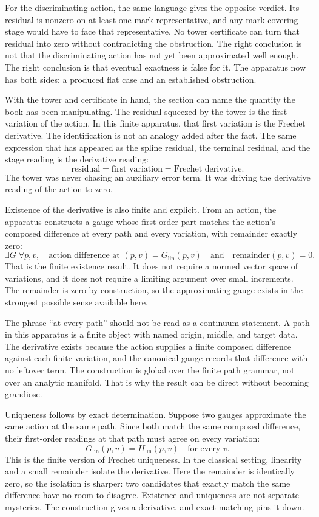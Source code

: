 For the discriminating action, the same language gives the opposite verdict.
Its residual is nonzero on at least one mark representative, and any
mark-covering stage would have to face that representative. No tower certificate
can turn that residual into zero without contradicting the obstruction. The
right conclusion is not that the discriminating action has not yet been
approximated well enough. The right conclusion is that eventual exactness is
false for it. The apparatus now has both sides: a produced flat case and an
established obstruction.

With the tower and certificate in hand, the section can name the quantity the
book has been manipulating. The residual squeezed by the tower is the first
variation of the action. In this finite apparatus, that first variation is the
Frechet derivative. The identification is not an analogy added after the fact.
The same expression that has appeared as the spline residual, the terminal
residual, and the stage reading is the derivative reading:
\[
  \text{residual}
  =
  \text{first variation}
  =
  \text{Frechet derivative}.
\]
The tower was never chasing an auxiliary error term. It was driving the
derivative reading of the action to zero.

Existence of the derivative is also finite and explicit. From an action, the
apparatus constructs a gauge whose first-order part matches the action's composed
difference at every path and every variation, with remainder exactly zero:
\[
  \exists G\;\forall p,v,\quad
  \text{action difference at }(p,v)
  =
  G_{\mathrm{lin}}(p,v)
  \quad\text{and}\quad
  \text{remainder}(p,v)=0.
\]
That is the finite existence result. It does not require a normed vector space
of variations, and it does not require a limiting argument over small
increments. The remainder is zero by construction, so the approximating gauge
exists in the strongest possible sense available here.

The phrase ``at every path'' should not be read as a continuum statement. A path
in this apparatus is a finite object with named origin, middle, and target data.
The derivative exists because the action supplies a finite composed difference
against each finite variation, and the canonical gauge records that difference
with no leftover term. The construction is global over the finite path grammar,
not over an analytic manifold. That is why the result can be direct without
becoming grandiose.

Uniqueness follows by exact determination. Suppose two gauges approximate the
same action at the same path. Since both match the same composed difference,
their first-order readings at that path must agree on every variation:
\[
  G_{\mathrm{lin}}(p,v)=H_{\mathrm{lin}}(p,v)
  \quad\text{for every }v.
\]
This is the finite version of Frechet uniqueness. In the classical setting,
linearity and a small remainder isolate the derivative. Here the remainder is
identically zero, so the isolation is sharper: two candidates that exactly
match the same difference have no room to disagree. Existence and uniqueness
are not separate mysteries. The construction gives a derivative, and exact
matching pins it down.

